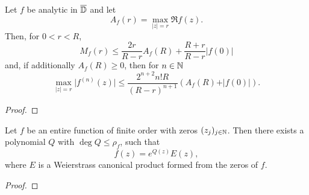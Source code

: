 \begin{lemma} \label{lem:borel-caratheodory}
    Let $f$ be analytic in $\overline{\mathbb{D}}$ and let
    $$ A_f(r) = \max_{\vert z \vert = r} \Re f(z). $$
    Then, for $0 < r < R$,
    $$ M_f(r) \leq \frac{2r}{R - r} A_f(R) + \frac{R + r}{R - r} \vert f(0) \vert $$
    and, if additionally $A_f(R) \geq 0$, then for $n \in \mathbb{N}$
    $$ \max_{\vert z \vert = r} \vert f^{(n)}(z) \vert \leq \frac{2^{n+2} n! R}{(R - r)^{n+1}} (A_f(R) + \vert f(0) \vert). $$
\end{lemma}

\begin{proof}
\end{proof}

\begin{theorem}[Hadamard] \label{thm:hadamard}
    Let $f$ be an entire function of finite order with zeros $(z_j)_{j \in \mathbb{N}}$. Then there exists a polynomial $Q$ with $\deg Q \leq \rho_f$, such that
    $$ f(z) = e^{Q(z)} E(z), $$
    where $E$ is a Weierstrass canonical product formed from the zeros of $f$.
\end{theorem}

\begin{proof}
\end{proof}